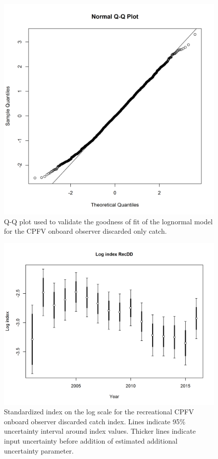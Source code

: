 \documentclass[12pt,]{article}
\begin{document}
\FloatBarrier

\begin{figure}[htbp]
\centering
\includegraphics{Figures/Fleet6_RecDD_QQ.png}
\caption{Q-Q plot used to validate the goodness of fit of the lognormal
model for the CPFV onboard observer discarded only catch.
\label{fig:Fleet6_RecDD_QQ}}
\end{figure}

\begin{figure}[htbp]
\centering
\includegraphics{r4ss/plots_mod1/index4_logcpuedata_RecDD.png}
\caption{Standardized index on the log scale for the recreational CPFV
onboard observer discarded catch index. Lines indicate 95\% uncertainty
interval around index values. Thicker lines indicate input uncertainty
before addition of estimated additional uncertainty parameter.
\label{fig:Fleet6_index4_logcpuedata_RecDD}}
\end{figure}
\end{document}
